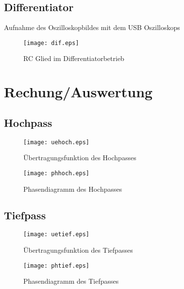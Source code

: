 \documentclass[a4paper]{article}
\begin{document}
\subsection{Differentiator}

Aufnahme des Oszilloskopbildes mit dem USB Oszilloskops
\begin{figure}[ht]
  \begin{center}
    \texttt{[image: dif.eps]}
  \end{center}
  \caption{RC Glied im Differentiatorbetrieb}
  \label{fig:6}
\end{figure}


\newpage
\section{Rechung/Auswertung}
\subsection{Hochpass}

\begin{figure}[ht]
  \begin{center}
    \texttt{[image: uehoch.eps]}
  \end{center}
  \caption{Übertragungsfunktion des Hochpasses}
  \label{fig:1}
\end{figure}

\begin{figure}[ht]
  \begin{center}
    \texttt{[image: phhoch.eps]}
  \end{center}
  \caption{Phasendiagramm des Hochpasses}
  \label{fig:2}
\end{figure}
\newpage
\subsection{Tiefpass}
\begin{figure}[ht]
  \begin{center}
    \texttt{[image: uetief.eps]}
  \end{center}
  \caption{Übertragungsfunktion des Tiefpasses}
  \label{fig:3}
\end{figure}

\begin{figure}[ht]
  \begin{center}
    \texttt{[image: phtief.eps]}
  \end{center}
  \caption{Phasendiagramm des Tiefpasses}
  \label{fig:4}
\end{figure}
\end{document}
